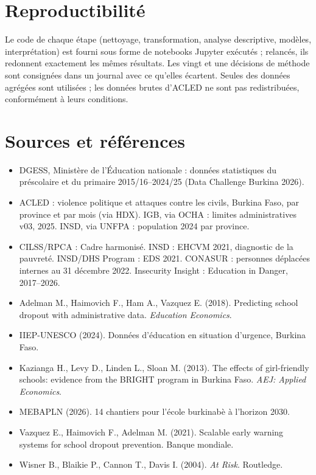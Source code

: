 \documentclass[11pt,a4paper]{article}
\begin{document}
\section{Reproductibilité}
Le code de chaque étape (nettoyage, transformation, analyse descriptive, modèles, interprétation) est fourni sous forme de notebooks Jupyter exécutés ; relancés, ils redonnent exactement les mêmes résultats. Les vingt et une décisions de méthode sont consignées dans un journal avec ce qu'elles écartent. Seules des données agrégées sont utilisées ; les données brutes d'ACLED ne sont pas redistribuées, conformément à leurs conditions.

\section*{Sources et références}
\small
\begin{itemize}[leftmargin=*]
\item DGESS, Ministère de l'Éducation nationale : données statistiques du préscolaire et du primaire 2015/16--2024/25 (Data Challenge Burkina 2026).
\item ACLED : violence politique et attaques contre les civils, Burkina Faso, par province et par mois (via HDX). IGB, via OCHA : limites administratives v03, 2025. INSD, via UNFPA : population 2024 par province.
\item CILSS/RPCA : Cadre harmonisé. INSD : EHCVM 2021, diagnostic de la pauvreté. INSD/DHS Program : EDS 2021. CONASUR : personnes déplacées internes au 31 décembre 2022. Insecurity Insight : Education in Danger, 2017--2026.
\item Adelman M., Haimovich F., Ham A., Vazquez E. (2018). Predicting school dropout with administrative data. \emph{Education Economics}.
\item IIEP-UNESCO (2024). Données d'éducation en situation d'urgence, Burkina Faso.
\item Kazianga H., Levy D., Linden L., Sloan M. (2013). The effects of girl-friendly schools: evidence from the BRIGHT program in Burkina Faso. \emph{AEJ: Applied Economics}.
\item MEBAPLN (2026). 14 chantiers pour l'école burkinabè à l'horizon 2030.
\item Vazquez E., Haimovich F., Adelman M. (2021). Scalable early warning systems for school dropout prevention. Banque mondiale.
\item Wisner B., Blaikie P., Cannon T., Davis I. (2004). \emph{At Risk}. Routledge.
\end{itemize}
\end{document}

